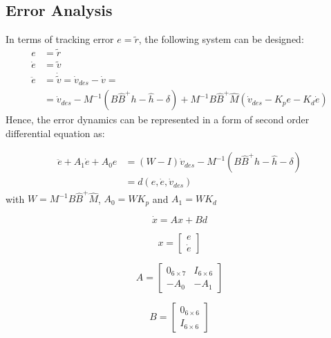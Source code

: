     \subsection{Error Analysis}
    In terms of tracking error $e = \tilde{r}$, the following system can 
    be designed:
    \begin{equation}
    \begin{aligned}
        e &= \tilde{r} \\
        \dot e &= \tilde{v} \\
        \ddot e &= \dot{\tilde{v}} = \dot{v}_{des} - \dot{v} = \\
        &= \dot{v}_{des} - M^{-1}(B\hat{B}^{+}h - \hat h - \delta) + 
        M^{-1}B\hat{B}^{+}\hat{M}(\dot{v}_{des} - K_pe - K_d \dot e)
    \end{aligned}
    \end{equation}
    Hence, the error dynamics can be represented in a form of second order differential 
    equation as:

    \begin{equation}
        \begin{aligned}
            \ddot e + A_1 \dot e + A_0 e  &= (W-I)\dot{v}_{des}
            - M^{-1}(B\hat{B}^{+}h - \hat h - \delta)\\
            &=d(e, \dot{e}, \dot{v}_{des})
        \end{aligned}
    \end{equation}
    with $W = M^{-1}B\hat{B}^{+}\hat{M}$, $A_0 = WK_p$ and $A_1 = WK_d$

    \begin{equation}
        \dot x = Ax + Bd
    \end{equation}

    $$
    x = \begin{bmatrix} e \\ \dot e \end{bmatrix} 
    $$

    $$ A = \begin{bmatrix} 0_{6 \times 7} & I_{6 \times 6} \\ -A_0 & -A_1 \end{bmatrix}$$

    $$ B = \begin{bmatrix} 0_{6 \times 6} \\ I_{ 6 \times 6} \end{bmatrix}$$

